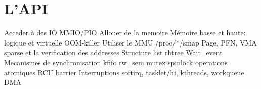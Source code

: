 %
%
%

\part{L'API}

  Acceder à des IO
    MMIO/PIO
  Allouer de la memoire
    Mémoire basse et haute: logique et virtuelle
    OOM-killer
  Utiliser le MMU
    /proc/*/smap
    Page, PFN, VMA
    sparse et la verification des addresses
  Structure
     list
     rbtree
  Wait_event
  Mecanismes de synchronisation
     kfifo
     rw_sem
     mutex
     spinlock
     operations atomiques
     RCU
     barrier
  Interruptions
    softirq, tasklet/hi,
  kthreads, workqueue
  DMA

